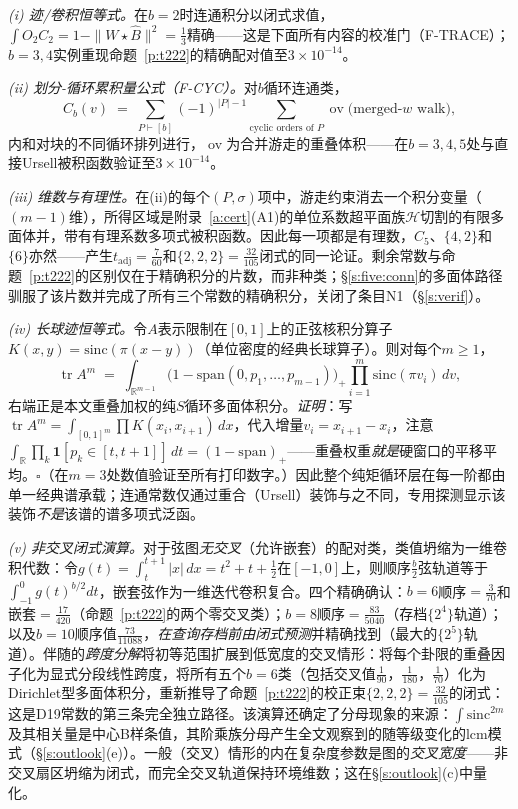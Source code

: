 \documentclass[11pt]{article}
\numberwithin{equation}{section}
\theoremstyle{definition}
\theoremstyle{remark}
\begin{document}
\emph{(i) 迹/卷积恒等式。}在$b=2$时连通积分以闭式求值，$\int O_2C_2=1-\|W\star\widehat B\|^{2}=\tfrac13$精确——这是下面所有内容的校准门（F-TRACE）；$b=3,4$实例重现命题~\ref{p:t222}的精确配对值至$3\times10^{-14}$。

\emph{(ii) 划分-循环累积量公式（F-CYC）。}对$b$循环连通类，
\[
C_b(v)\;=\;\sum_{P\vdash[b]}(-1)^{|P|-1}
\sum_{\text{cyclic orders of }P}
\operatorname{ov}\bigl(\text{merged-}w\text{ walk}\bigr),
\]
内和对块的不同循环排列进行，$\operatorname{ov}$为合并游走的重叠体积——在$b=3,4,5$处与直接Ursell被积函数验证至$3\times10^{-14}$。

\emph{(iii) 维数与有理性。}在(ii)的每个$(P,\sigma)$项中，游走约束消去一个积分变量（$(m-1)$维），所得区域是附录~\ref{a:cert}(A1)的单位系数超平面族$\mathcal H$切割的有限多面体并，带有有理系数多项式被积函数。因此每一项都是有理数，$C_5$、$\{4,2\}$和$\{6\}$亦然——产生$t_{\mathrm{adj}}=\tfrac7{60}$和$\{2,2,2\}=\tfrac{32}{105}$闭式的同一论证。剩余常数与命题~\ref{p:t222}的区别仅在于精确积分的片数，而非种类；\S\ref{s:five:conn}的多面体路径驯服了该片数并完成了所有三个常数的精确积分，关闭了条目N1（\S\ref{s:verif}）。

\emph{(iv) 长球迹恒等式。}令$A$表示限制在$[0,1]$上的正弦核积分算子$K(x,y)=\mathrm{sinc}(\pi(x-y))$（单位密度的经典长球算子）。则对每个$m\ge1$，
\[
\operatorname{tr}A^{m}
\;=\;\int_{\mathbb R^{m-1}}
\bigl(1-\mathrm{span}(0,p_1,\dots,p_{m-1})\bigr)_+
\prod_{i=1}^{m}\mathrm{sinc}(\pi v_i)\,dv ,
\]
右端正是本文重叠加权的纯$S$循环多面体积分。\emph{证明}：写$\operatorname{tr}A^m=\int_{[0,1]^m}\prod K(x_i,x_{i+1})\,dx$，代入增量$v_i=x_{i+1}-x_i$，注意$\int_{\mathbb R}\prod_k\mathbf 1[p_k\in[t,t+1]]\,dt =(1-\mathrm{span})_+$——重叠权重\emph{就是}硬窗口的平移平均。$\square$（在$m=3$处数值验证至所有打印数字。）因此整个纯矩循环层在每一阶都由单一经典谱承载；连通常数仅通过重合（Ursell）装饰与之不同，专用探测显示该装饰\emph{不是}该谱的谱多项式泛函。

\emph{(v) 非交叉闭式演算。}对于弦图\emph{无交叉}（允许嵌套）的配对类，类值坍缩为一维卷积代数：令$g(t)=\int_t^{t+1}|x|\,dx=t^2+t+\tfrac12$在$[-1,0]$上，则顺序$\tfrac b2$弦轨道等于$\int_{-1}^{0}g(t)^{b/2}dt$，嵌套弦作为一维迭代卷积复合。四个精确确认：$b=6$顺序$=\tfrac3{70}$和嵌套$=\tfrac{17}{420}$（命题~\ref{p:t222}的两个零交叉类）；$b=8$顺序$=\tfrac{83}{5040}$（存档$\{2^4\}$轨道）；以及$b=10$顺序值$\tfrac{73}{11088}$，\emph{在查询存档前由闭式预测}并精确找到（最大的$\{2^5\}$轨道）。伴随的\emph{跨度分解}将初等范围扩展到低宽度的交叉情形：将每个卦限的重叠因子化为显式分段线性跨度，将所有五个$b=6$类（包括交叉值$\tfrac1{90}$，$\tfrac1{180}$，$\tfrac1{70}$）化为Dirichlet型多面体积分，重新推导了命题~\ref{p:t222}的校正束$\{2,2,2\}=\tfrac{32}{105}$的闭式：这是D19常数的第三条完全独立路径。该演算还确定了分母现象的来源：$\int\mathrm{sinc}^{2m}$及其相关量是中心B样条值，其阶乘族分母产生全文观察到的随等级变化的$\mathrm{lcm}$模式（\S\ref{s:outlook}(e)）。一般（交叉）情形的内在复杂度参数是图的\emph{交叉宽度}——非交叉扇区坍缩为闭式，而完全交叉轨道保持环境维数；这在\S\ref{s:outlook}(c)中量化。
\end{document}

